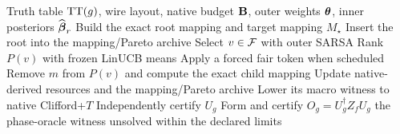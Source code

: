 \begin{algorithm}[t]
\caption{Hierarchical exact synthesis of a Boolean phase oracle}
\label{alg:oracle-search}
\begin{algorithmic}[1]
\Require Truth table $\operatorname{TT}(g)$, wire layout, native budget $\mathbf{B}$, outer weights $\boldsymbol{\theta}$, inner posteriors $\widehat{\boldsymbol{\beta}}_r$
\State Build the exact root mapping and target mapping $M_\star$
\State Insert the root into the mapping/Pareto archive
  \State Select $v\in\mathcal{F}$ with outer SARSA
  \State Rank $P(v)$ with frozen LinUCB means
  \State Apply a forced fair token when scheduled
    \State Remove $m$ from $P(v)$ and compute the exact child mapping
    \State Update native-derived resources and the mapping/Pareto archive
      \State Lower its macro witness to native Clifford+$T$
      \State Independently certify $U_g$
      \State Form and certify $O_g=U_g^\dagger Z_fU_g$
       \Return the phase-oracle witness \EndIf
    \EndIf
  \EndFor
\EndWhile
\State \Return unsolved within the declared limits
\end{algorithmic}
\end{algorithm}
